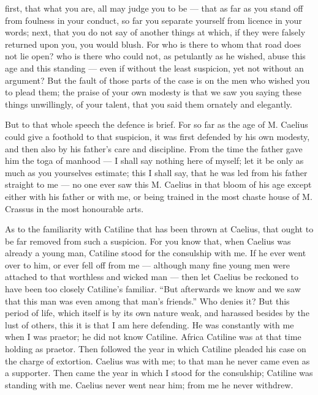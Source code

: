  first, that what you are, all may judge you to be --- that as far as you stand off from foulness in your conduct, so far you separate yourself from licence in your words; next, that you do not say of another things at which, if they were falsely returned upon you, you would blush. For who is there to whom that road does not lie open? who is there who could not, as petulantly as he wished, abuse this age and this standing --- even if without the least suspicion, yet not without an argument? But the fault of those parts of the case is on the men who wished you to plead them; the praise of your own modesty is that we saw you saying these things unwillingly, of your talent, that you said them ornately and elegantly.

 But to that whole speech the defence is brief. For so far as the age of M. Caelius could give a foothold to that suspicion, it was first defended by his own modesty, and then also by his father's care and discipline. From the time the father gave him the toga of manhood --- I shall say nothing here of myself; let it be only as much as you yourselves estimate; this I shall say, that he was led from his father straight to me --- no one ever saw this M. Caelius in that bloom of his age except either with his father or with me, or being trained in the most chaste house of M. Crassus in the most honourable arts.

 As to the familiarity with Catiline that has been thrown at Caelius, that ought to be far removed from such a suspicion. For you know that, when Caelius was already a young man, Catiline stood for the consulship with me. If he ever went over to him, or ever fell off from me --- although many fine young men were attached to that worthless and wicked man --- then let Caelius be reckoned to have been too closely Catiline's familiar. ``But afterwards we know and we saw that this man was even among that man's friends.'' Who denies it? But this period of life, which itself is by its own nature weak, and harassed besides by the lust of others, this it is that I am here defending. He was constantly with me when I was praetor; he did not know Catiline. Africa Catiline was at that time holding as praetor. Then followed the year in which Catiline pleaded his case on the charge of extortion. Caelius was with me; to that man he never came even as a supporter. Then came the year in which I stood for the consulship; Catiline was standing with me. Caelius never went near him; from me he never withdrew.

